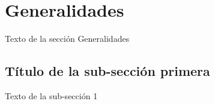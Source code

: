 \section{Generalidades}

Texto de la sección Generalidades


\subsection{Título de la sub-sección primera}

Texto de la sub-sección 1
